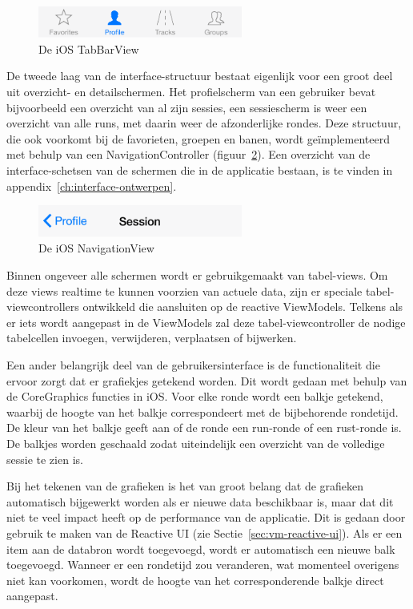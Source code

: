 \begin{figure}[h!t]
\centering
\includegraphics[width=0.6\textwidth]{style/images/TabView}
\caption{De iOS TabBarView}
\label{fig:tab-view}
\end{figure}

De tweede laag van de interface-structuur bestaat eigenlijk voor een groot deel uit overzicht- en detailschermen. Het profielscherm van een gebruiker bevat bijvoorbeeld een overzicht van al zijn sessies, een sessiescherm is weer een overzicht van alle runs, met daarin weer de afzonderlijke rondes. Deze structuur, die ook voorkomt bij de favorieten, groepen en banen, wordt geïmplementeerd met behulp van een NavigationController (figuur~\ref{fig:navigation-view}). Een overzicht van de interface-schetsen van de schermen die in de applicatie bestaan, is te vinden in appendix~\ref{ch:interface-ontwerpen}.

\begin{figure}[h!t]
\centering
\includegraphics[width=0.6\textwidth]{style/images/NavigationView}
\caption{De iOS NavigationView}
\label{fig:navigation-view}
\end{figure}

Binnen ongeveer alle schermen wordt er gebruikgemaakt van tabel-views. Om deze views realtime te kunnen voorzien van actuele data, zijn er speciale tabel-viewcontrollers ontwikkeld die aansluiten op de reactive ViewModels. Telkens als er iets wordt aangepast in de ViewModels zal deze tabel-viewcontroller de nodige tabelcellen invoegen, verwijderen, verplaatsen of bijwerken.

Een ander belangrijk deel van de gebruikersinterface is de functionaliteit die ervoor zorgt dat er grafiekjes getekend worden. Dit wordt gedaan met behulp van de CoreGraphics functies in iOS. Voor elke ronde wordt een balkje getekend, waarbij de hoogte van het balkje correspondeert met de bijbehorende rondetijd. De kleur van het balkje geeft aan of de ronde een run-ronde of een rust-ronde is. De balkjes worden geschaald zodat uiteindelijk een overzicht van de volledige sessie te zien is.

Bij het tekenen van de grafieken is het van groot belang dat de grafieken automatisch bijgewerkt worden als er nieuwe data beschikbaar is, maar dat dit niet te veel impact heeft op de performance van de applicatie. Dit is gedaan door gebruik te maken van de Reactive UI (zie Sectie~\ref{sec:vm-reactive-ui}). Als er een item aan de databron wordt toegevoegd, wordt er automatisch een nieuwe balk toegevoegd. Wanneer er een rondetijd zou veranderen, wat momenteel overigens niet kan voorkomen, wordt de hoogte van het corresponderende balkje direct aangepast.


